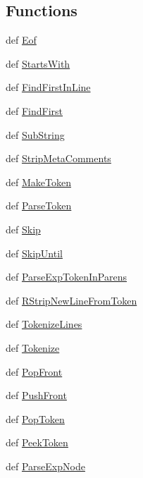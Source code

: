 \subsection*{Functions}
\begin{DoxyCompactItemize}
\item 
def \hyperlink{namespacepump_ace406cec139528a5aa1640edf8dbebe6}{Eof}
\item 
def \hyperlink{namespacepump_a291b93315bfdd697deaee88680502c00}{Starts\-With}
\item 
def \hyperlink{namespacepump_acca697b3cc5adc6044b115e9e16c019e}{Find\-First\-In\-Line}
\item 
def \hyperlink{namespacepump_a9713ad82d1c87f60ad986c6ce96f0002}{Find\-First}
\item 
def \hyperlink{namespacepump_a0d1ed8e160c333130bd8f84c8fe457e5}{Sub\-String}
\item 
def \hyperlink{namespacepump_a23b6bb138dc055b93b9d13d0b092a725}{Strip\-Meta\-Comments}
\item 
def \hyperlink{namespacepump_ae95150dec49136d71303f5f4239dd5b6}{Make\-Token}
\item 
def \hyperlink{namespacepump_a85396ae3b56877c067788f45b163eff5}{Parse\-Token}
\item 
def \hyperlink{namespacepump_a2a4a78c5cca4b815e2f323eba9245dd4}{Skip}
\item 
def \hyperlink{namespacepump_a14ce849109475f0297844fb68697f5ef}{Skip\-Until}
\item 
def \hyperlink{namespacepump_a44d91c490d21a9119501d099e6caf547}{Parse\-Exp\-Token\-In\-Parens}
\item 
def \hyperlink{namespacepump_ad52cab2935ab52c2ff26aac5196a1ace}{R\-Strip\-New\-Line\-From\-Token}
\item 
def \hyperlink{namespacepump_abbbf5e37a9a7dda79d6c53a99f373e27}{Tokenize\-Lines}
\item 
def \hyperlink{namespacepump_a20d8ba8cc8ad85c10542e430e790e3ff}{Tokenize}
\item 
def \hyperlink{namespacepump_abcc5a745b7c32c2f7ad56db0927e7e95}{Pop\-Front}
\item 
def \hyperlink{namespacepump_a2564f2b542c763cb63e04b6ebf677ab6}{Push\-Front}
\item 
def \hyperlink{namespacepump_a40f31f2cc2901242a70790e6076852c2}{Pop\-Token}
\item 
def \hyperlink{namespacepump_a31f67c63f8ebc024712e16220432b3ff}{Peek\-Token}
\item 
def \hyperlink{namespacepump_a150cd6bba14352433acc753d4591670e}{Parse\-Exp\-Node}

\end{DoxyCompactItemize}
